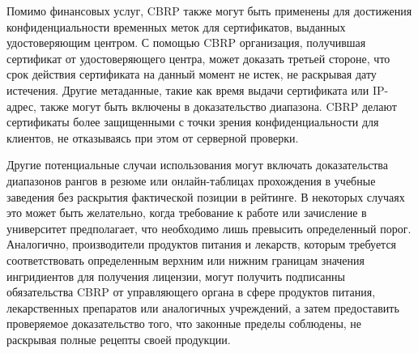 Помимо финансовых услуг, CBRP также могут быть применены для достижения конфиденциальности временных меток для сертификатов, выданных удостоверяющим центром.
С помощью CBRP организация, получившая сертификат от удостоверяющего центра, может доказать третьей стороне, что срок действия сертификата на данный момент не истек, не раскрывая дату истечения.
Другие метаданные, такие как время выдачи сертификата или IP-адрес, также могут быть включены в доказательство диапазона.
CBRP делают сертификаты более защищенными с точки зрения конфиденциальности для клиентов, не отказываясь при этом от серверной проверки.

Другие потенциальные случаи использования могут включать доказательства диапазонов рангов в резюме или онлайн-таблицах прохождения в учебные заведения без раскрытия фактической позиции в рейтинге.
В некоторых случаях это может быть желательно, когда требование к работе  или зачисление в университет предполагает, что необходимо лишь превысить определенный порог.
Аналогично, производители продуктов питания и лекарств, которым требуется соответствовать определенным верхним или нижним границам значения ингридиентов для получения лицензии, могут получить подписанны обязательства CBRP от управляющего органа в сфере продуктов питания, лекарственных препаратов или аналогичных учреждений, а затем предоставить проверяемое доказательство того, что законные пределы соблюдены, не раскрывая полные рецепты своей продукции.
